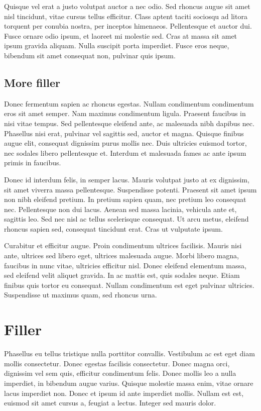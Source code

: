 Quisque vel erat a justo volutpat auctor a nec odio. Sed rhoncus augue sit amet nisl tincidunt, vitae cursus tellus efficitur. Class aptent taciti sociosqu ad litora torquent per conubia nostra, per inceptos himenaeos. Pellentesque et auctor dui. Fusce ornare odio ipsum, et laoreet mi molestie sed. Cras at massa sit amet ipsum gravida aliquam. Nulla suscipit porta imperdiet. Fusce eros neque, bibendum sit amet consequat non, pulvinar quis ipsum.

\subsection{More filler}
Donec fermentum sapien ac rhoncus egestas. Nullam condimentum condimentum eros sit amet semper. Nam maximus condimentum ligula. Praesent faucibus in nisi vitae tempus. Sed pellentesque eleifend ante, ac malesuada nibh dapibus nec. Phasellus nisi erat, pulvinar vel sagittis sed, auctor et magna. Quisque finibus augue elit, consequat dignissim purus mollis nec. Duis ultricies euismod tortor, nec sodales libero pellentesque et. Interdum et malesuada fames ac ante ipsum primis in faucibus.

Donec id interdum felis, in semper lacus. Mauris volutpat justo at ex dignissim, sit amet viverra massa pellentesque. Suspendisse potenti. Praesent sit amet ipsum non nibh eleifend pretium. In pretium sapien quam, nec pretium leo consequat nec. Pellentesque non dui lacus. Aenean sed massa lacinia, vehicula ante et, sagittis leo. Sed nec nisl ac tellus scelerisque consequat. Ut arcu metus, eleifend rhoncus sapien sed, consequat tincidunt erat. Cras ut vulputate ipsum.

Curabitur et efficitur augue. Proin condimentum ultrices facilisis. Mauris nisi ante, ultrices sed libero eget, ultrices malesuada augue. Morbi libero magna, faucibus in nunc vitae, ultricies efficitur nisl. Donec eleifend elementum massa, sed eleifend velit aliquet gravida. In ac mattis est, quis sodales neque. Etiam finibus quis tortor eu consequat. Nullam condimentum est eget pulvinar ultricies. Suspendisse ut maximus quam, sed rhoncus urna.

\section{Filler}
Phasellus eu tellus tristique nulla porttitor convallis. Vestibulum ac est eget diam mollis consectetur. Donec egestas facilisis consectetur. Donec magna orci, dignissim vel sem quis, efficitur condimentum felis. Donec mollis leo a nulla imperdiet, in bibendum augue varius. Quisque molestie massa enim, vitae ornare lacus imperdiet non. Donec et ipsum id ante imperdiet mollis. Nullam est est, euismod sit amet cursus a, feugiat a lectus. Integer sed mauris dolor.

